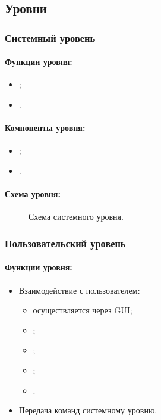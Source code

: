 \documentclass[12pt,a4paper,fullpage,titlepage]{article}
\begin{document}
\newpage
\subsection{Уровни}
\subsubsection{Системный уровень}

\paragraph{Функции уровня:}
\begin{itemize}
	\item ;
	\item .\\
\end{itemize}

\paragraph{Компоненты уровня:}
\begin{itemize}
	\item ;
	\item .\\
\end{itemize}

\paragraph{Схема уровня:}

\begin{figure}[thbp!]
	\centering
	
	\caption{Схема системного уровня.}
\end{figure}

\newpage
\subsubsection{Пользовательский уровень}

\paragraph{Функции уровня:}
\begin{itemize}
	\item Взаимодействие с пользователем:
	\begin{itemize}
		\item осуществляется через GUI;
		\item ;
		\item ;
		\item ;
		\item .
	\end{itemize}
	\item Передача команд системному уровню.\\
\end{itemize}
\end{document}

